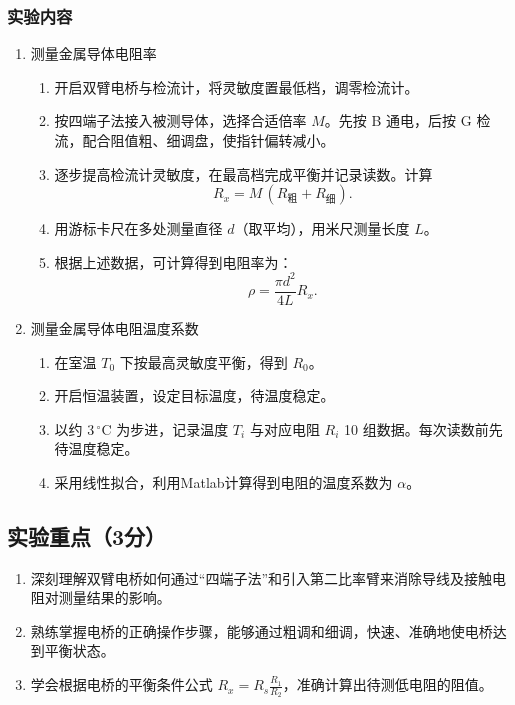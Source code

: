 \documentclass[]{../../templates/Report}%
\begin{document}
\subsubsection{实验内容}
\begin{enumerate}[label=(\arabic*)]
    \item 测量金属导体电阻率
    \begin{enumerate}[label=\roman*.]
        \item 开启双臂电桥与检流计，将灵敏度置最低档，调零检流计。
        \item 按四端子法接入被测导体，选择合适倍率 $M$。先按 B 通电，后按 G 检流，配合阻值粗、细调盘，使指针偏转减小。
        \item 逐步提高检流计灵敏度，在最高档完成平衡并记录读数。计算
        \begin{equation}
            R_x = M \,(R_{\text{粗}} + R_{\text{细}}).
        \end{equation}
        \item 用游标卡尺在多处测量直径 $d$（取平均），用米尺测量长度 $L$。
        \item 根据上述数据，可计算得到电阻率为：
        \begin{equation}
            \rho = \frac{\pi d^2}{4L}R_x .
        \end{equation}
    \end{enumerate}

    \item 测量金属导体电阻温度系数
    \begin{enumerate}[label=\roman*.]
        \item 在室温 $T_0$ 下按最高灵敏度平衡，得到 $R_0$。
        \item 开启恒温装置，设定目标温度，待温度稳定。
        \item 以约 $3\,^\circ\mathrm{C}$ 为步进，记录温度 $T_i$ 与对应电阻 $R_i$ 10 组数据。每次读数前先待温度稳定。
        \item 采用线性拟合，利用Matlab计算得到电阻的温度系数为 $\alpha$。
    \end{enumerate}
\end{enumerate}

\subsection{实验重点（3分）}
\begin{enumerate}
    \item 深刻理解双臂电桥如何通过“四端子法”和引入第二比率臂来消除导线及接触电阻对测量结果的影响。
    \item 熟练掌握电桥的正确操作步骤，能够通过粗调和细调，快速、准确地使电桥达到平衡状态。
    \item 学会根据电桥的平衡条件公式 $R_x = R_s \frac{R_1}{R_2}$，准确计算出待测低电阻的阻值。
\end{enumerate}
\end{document}

